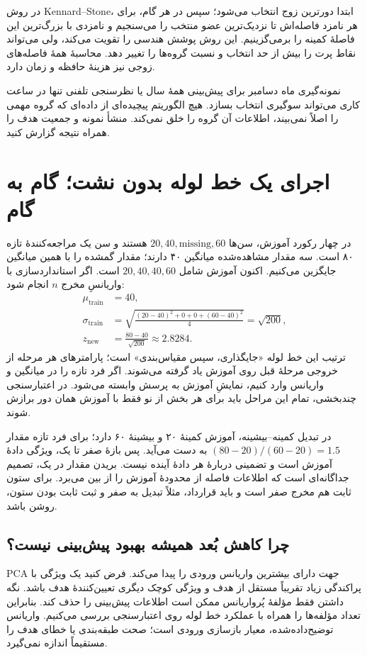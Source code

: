 در روش Kennard--Stone، ابتدا دورترین زوج انتخاب می‌شود؛ سپس در هر گام، برای هر نامزد فاصله‌اش تا نزدیک‌ترین عضو منتخب را می‌سنجیم و نامزدی با بزرگ‌ترین این فاصلهٔ کمینه را برمی‌گزینیم. این روش پوشش هندسی را تقویت می‌کند، ولی می‌تواند نقاط پرت را بیش از حد انتخاب و نسبت گروه‌ها را تغییر دهد. محاسبهٔ همهٔ فاصله‌های زوجی نیز هزینهٔ حافظه و زمان دارد.

نمونه‌گیری ماه دسامبر برای پیش‌بینی همهٔ سال یا نظرسنجی تلفنی تنها در ساعت کاری می‌تواند سوگیری انتخاب بسازد. هیچ الگوریتم پیچیده‌ای از داده‌ای که گروه مهمی را اصلاً نمی‌بیند، اطلاعات آن گروه را خلق نمی‌کند. منشأ نمونه و جمعیت هدف را همراه نتیجه گزارش کنید.
\section{اجرای یک خط لوله بدون نشت؛ گام به گام}
در چهار رکورد آموزش، سن‌ها $20,40,\text{missing},60$ هستند و سن یک مراجعه‌کنندهٔ تازه ۸۰ است. سه مقدار مشاهده‌شده میانگین ۴۰ دارند؛ مقدار گمشده را با همین میانگین جایگزین می‌کنیم. اکنون آموزش شامل $20,40,40,60$ است. اگر استانداردسازی با واریانسِ مخرج $n$ انجام شود:
\begin{align*}
\mu_{\mathrm{train}}&=40,\\
\sigma_{\mathrm{train}}&=\sqrt{\frac{(20-40)^2+0+0+(60-40)^2}{4}}=\sqrt{200},\\
z_{\mathrm{new}}&=\frac{80-40}{\sqrt{200}}\approx2.8284.
\end{align*}
ترتیب این خط لوله «جایگذاری، سپس مقیاس‌بندی» است؛ پارامترهای هر مرحله از خروجی مرحلهٔ قبل روی آموزش یاد گرفته می‌شوند. اگر فرد تازه را در میانگین و واریانس وارد کنیم، نمایشِ آموزش به پرسش وابسته می‌شود. در اعتبارسنجی چندبخشی، تمام این مراحل باید برای هر بخش از نو فقط با آموزش همان دور برازش شوند.

در تبدیل کمینه–بیشینه، آموزش کمینهٔ ۲۰ و بیشینهٔ ۶۰ دارد؛ برای فرد تازه مقدار $(80-20)/(60-20)=1.5$ به دست می‌آید. پس بازهٔ صفر تا یک، ویژگی دادهٔ آموزش است و تضمینی دربارهٔ هر دادهٔ آینده نیست. بریدن مقدار در یک، تصمیم جداگانه‌ای است که اطلاعات فاصله از محدودهٔ آموزش را از بین می‌برد. برای ستون ثابت هم مخرج صفر است و باید قرارداد، مثلاً تبدیل به صفر و ثبت ثابت بودن ستون، روشن باشد.

\subsection*{چرا کاهش بُعد همیشه بهبود پیش‌بینی نیست؟}
PCA جهت دارای بیشترین واریانس ورودی را پیدا می‌کند. فرض کنید یک ویژگی با پراکندگی زیاد تقریباً مستقل از هدف و ویژگی کوچک دیگری تعیین‌کنندهٔ هدف باشد. نگه داشتن فقط مؤلفهٔ پُرواریانس ممکن است اطلاعات پیش‌بینی را حذف کند. بنابراین تعداد مؤلفه‌ها را همراه با عملکرد خط لوله روی اعتبارسنجی بررسی می‌کنیم. واریانس توضیح‌داده‌شده، معیار بازسازی ورودی است؛ صحت طبقه‌بندی یا خطای هدف را مستقیماً اندازه نمی‌گیرد.

